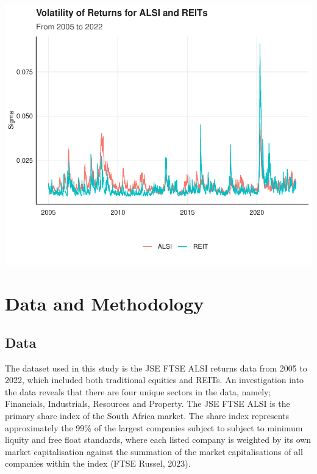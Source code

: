 \documentclass[11pt,preprint, authoryear]{elsarticle}
\let\origfigure\figure
\let\endorigfigure\endfigure
\renewenvironment{figure}[1][2] {
    \expandafter\origfigure\expandafter[H]
} {
    \endorigfigure
}
\numberwithin{equation}{section}
\numberwithin{figure}{section}
\numberwithin{table}{section}
\begin{document}
\begin{figure}
\centering
\includegraphics{Fin_Metrics_Project_files/figure-latex/unnamed-chunk-4-1.pdf}
\caption{Noise Reduced Volatility}
\end{figure}

\hypertarget{data-and-methodology}{%
\section{\texorpdfstring{Data and Methodology
\label{Methodology}}{Data and Methodology }}\label{data-and-methodology}}

\hypertarget{data}{%
\subsection{Data}\label{data}}

The dataset used in this study is the JSE FTSE ALSI returns data from
2005 to 2022, which included both traditional equities and REITs. An
investigation into the data reveals that there are four unique sectors
in the data, namely; Financials, Industrials, Resources and Property.
The JSE FTSE ALSI is the primary share index of the South Africa market.
The share index represents approximately the 99\% of the largest
companies subject to subject to minimum liquity and free float
standards, where each listed company is weighted by its own market
capitalisation against the summation of the market capitalisations of
all companies within the index (FTSE Russel, 2023).
\end{document}
